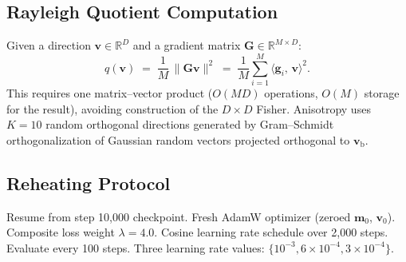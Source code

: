 \documentclass[11pt,a4paper]{article}
\newcommand{\vb}{\mathbf{v}_{\mathrm{b}}}
\newcommand{\R}{\mathbb{R}}
\newcommand{\inner}[2]{\langle #1,\, #2 \rangle}
\newcommand{\norm}[1]{\lVert #1 \rVert}
\begin{document}
\subsection{Rayleigh Quotient Computation}\label{sec:methods-rayleigh}

Given a direction $\mathbf{v} \in \R^D$ and a gradient matrix
$\mathbf{G} \in \R^{M \times D}$:
\begin{equation}
    q(\mathbf{v}) \;=\;
    \frac{1}{M}\,\norm{\mathbf{G}\mathbf{v}}^2
    \;=\;
    \frac{1}{M}\sum_{i=1}^{M} \inner{\mathbf{g}_i}{\mathbf{v}}^2.
\end{equation}
This requires one matrix--vector product ($O(MD)$ operations, $O(M)$ storage
for the result), avoiding construction of the $D \times D$ Fisher.  Anisotropy
uses $K = 10$ random orthogonal directions generated by Gram--Schmidt
orthogonalization of Gaussian random vectors projected orthogonal to $\vb$.

\subsection{Reheating Protocol}

Resume from step 10{,}000 checkpoint.  Fresh AdamW optimizer (zeroed
$\mathbf{m}_0$, $\mathbf{v}_0$).  Composite loss weight $\lambda = 4.0$.
Cosine learning rate schedule over 2{,}000 steps.  Evaluate every 100 steps.
Three learning rate values: $\{10^{-3}, 6 \times 10^{-4}, 3 \times 10^{-4}\}$.




\end{document}
